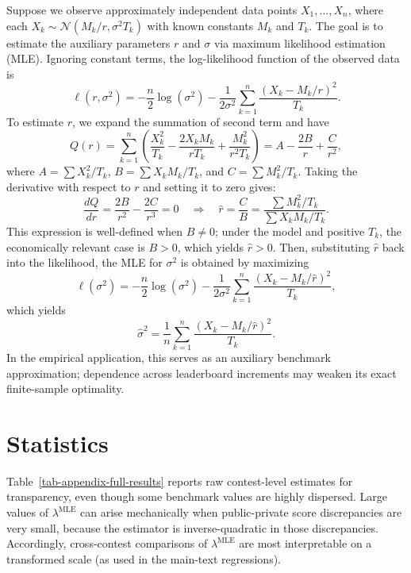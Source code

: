 \documentclass[mnsc]{informs3}
\begin{document}
\begin{APPENDICES}
Suppose we observe approximately independent data points \( X_1, ..., X_n \), where each \( X_k \sim \mathcal{N}(M_k / r, \sigma^2 T_k) \) with known constants \( M_k \) and \( T_k \).
The goal is to estimate the auxiliary parameters \( r \) and \( \sigma \) via maximum likelihood estimation (MLE).
Ignoring constant terms, the log-likelihood function of the observed data is
\[
\ell(r, \sigma^2) = - \frac{n}{2} \log(\sigma^2) - \frac{1}{2\sigma^2} \sum_{k=1}^n \frac{\left( X_k - M_k/r \right)^2}{T_k}.
\]
To estimate $r$, we expand the summation of second term and have
\[
Q(r) = \sum_{k=1}^n \left( \frac{X_k^2}{T_k} - \frac{2X_k M_k}{r T_k} + \frac{M_k^2}{r^2 T_k} \right)
= A - \frac{2B}{r} + \frac{C}{r^2},
\]
where \( A = \sum X_k^2/T_k \), \( B = \sum X_k M_k/T_k \), and \( C = \sum M_k^2/T_k \). Taking the derivative with respect to \( r \) and setting it to zero gives:
\begin{equation*}
\frac{dQ}{dr} = \frac{2B}{r^2} - \frac{2C}{r^3} = 0 \quad \Rightarrow \quad \hat{r} = \frac{C}{B} = \frac{\sum M_k^2/T_k}{\sum X_k M_k/T_k}.
\end{equation*}
This expression is well-defined when $B\neq 0$; under the model and positive $T_k$, the economically relevant case is $B>0$, which yields $\hat r>0$.
Then, substituting \( \hat{r} \) back into the likelihood, the MLE for \( \sigma^2 \) is obtained by maximizing
\[
\ell(\sigma^2) = -\frac{n}{2} \log(\sigma^2) - \frac{1}{2\sigma^2} \sum_{k=1}^n \frac{\left( X_k - M_k/\hat{r} \right)^2}{T_k},
\]
which yields
\begin{equation}\label{normal-mle-sigma}
\hat{\sigma}^2 = \frac{1}{n} \sum_{k=1}^n \frac{\left( X_k - M_k/\hat{r}\right)^2}{T_k}.
\end{equation}
In the empirical application, this serves as an auxiliary benchmark approximation; dependence across leaderboard increments may weaken its exact finite-sample optimality.








\section{Statistics}\label{appendix-statistics}

Table~\ref{tab-appendix-full-results} reports raw contest-level estimates for transparency, even though some benchmark values are highly dispersed.
Large values of $\lambda^{\text{MLE}}$ can arise mechanically when public-private score discrepancies are very small, because the estimator is inverse-quadratic in those discrepancies.
Accordingly, cross-contest comparisons of $\lambda^{\text{MLE}}$ are most interpretable on a transformed scale (as used in the main-text regressions).


\end{APPENDICES}
\end{document}
